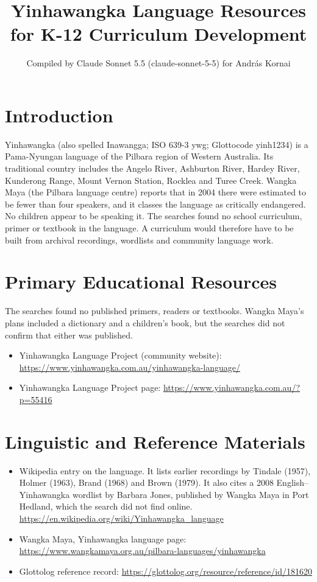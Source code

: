 \documentclass[12pt]{article}
\title{Yinhawangka Language Resources for K-12 Curriculum Development}
\author{Compiled by Claude Sonnet 5.5 (claude-sonnet-5-5) for Andr\'as Kornai}
\date{}
\begin{document}
\maketitle

\section{Introduction}
Yinhawangka (also spelled Inawangga; ISO 639-3 ywg; Glottocode yinh1234) is a Pama-Nyungan language of the Pilbara region of Western Australia. Its traditional country includes the Angelo River, Ashburton River, Hardey River, Kunderong Range, Mount Vernon Station, Rocklea and Turee Creek. Wangka Maya (the Pilbara language centre) reports that in 2004 there were estimated to be fewer than four speakers, and it classes the language as critically endangered. No children appear to be speaking it. The searches found no school curriculum, primer or textbook in the language. A curriculum would therefore have to be built from archival recordings, wordlists and community language work.

\section{Primary Educational Resources}
The searches found no published primers, readers or textbooks. Wangka Maya's plans included a dictionary and a children's book, but the searches did not confirm that either was published.
\begin{itemize}
\item Yinhawangka Language Project (community website): \url{https://www.yinhawangka.com.au/yinhawangka-language/}
\item Yinhawangka Language Project page: \url{https://www.yinhawangka.com.au/?p=55416}
\end{itemize}

\section{Linguistic and Reference Materials}
\begin{itemize}
\item Wikipedia entry on the language. It lists earlier recordings by Tindale (1957), Holmer (1963), Brand (1968) and Brown (1979). It also cites a 2008 English--Yinhawangka wordlist by Barbara Jones, published by Wangka Maya in Port Hedland, which the search did not find online. \url{https://en.wikipedia.org/wiki/Yinhawangka_language}
\item Wangka Maya, Yinhawangka language page: \url{https://www.wangkamaya.org.au/pilbara-languages/yinhawangka}
\item Glottolog reference record: \url{https://glottolog.org/resource/reference/id/181620}
\end{itemize}
\end{document}
